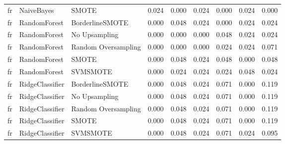 \begin{tabular}{lllllllll}
      fr &                   NaiveBayes &               SMOTE & 0.024 &                     0.000 &                 0.024 &                  0.000 &                                   0.024 &     0.000 \\
      fr &                 RandomForest &     BorderlineSMOTE & 0.000 &                     0.048 &                 0.024 &                  0.000 &                                   0.024 &     0.024 \\
      fr &                 RandomForest &       No Upsampling & 0.000 &                     0.000 &                 0.000 &                  0.048 &                                   0.024 &     0.024 \\
      fr &                 RandomForest & Random Oversampling & 0.000 &                     0.000 &                 0.000 &                  0.024 &                                   0.024 &     0.071 \\
      fr &                 RandomForest &               SMOTE & 0.000 &                     0.048 &                 0.024 &                  0.048 &                                   0.000 &     0.048 \\
      fr &                 RandomForest &            SVMSMOTE & 0.000 &                     0.024 &                 0.024 &                  0.024 &                                   0.048 &     0.024 \\
      fr &              RidgeClassifier &     BorderlineSMOTE & 0.000 &                     0.048 &                 0.024 &                  0.071 &                                   0.000 &     0.119 \\
      fr &              RidgeClassifier &       No Upsampling & 0.000 &                     0.048 &                 0.024 &                  0.071 &                                   0.000 &     0.119 \\
      fr &              RidgeClassifier & Random Oversampling & 0.000 &                     0.048 &                 0.024 &                  0.071 &                                   0.000 &     0.119 \\
      fr &              RidgeClassifier &               SMOTE & 0.000 &                     0.048 &                 0.024 &                  0.071 &                                   0.000 &     0.119 \\
      fr &              RidgeClassifier &            SVMSMOTE & 0.000 &                     0.048 &                 0.024 &                  0.071 &                                   0.024 &     0.095 \\

\end{tabular}
